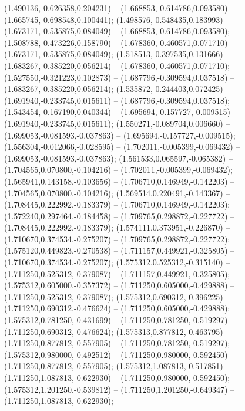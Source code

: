  (1.490136,-0.626358,0.204231) -- (1.668853,-0.614786,0.093580) -- (1.665745,-0.698548,0.100441);
 (1.498576,-0.548435,0.183993) -- (1.673171,-0.535875,0.084049) -- (1.668853,-0.614786,0.093580);
 (1.508788,-0.473226,0.158790) -- (1.678360,-0.460571,0.071710) -- (1.673171,-0.535875,0.084049);
 (1.518513,-0.397535,0.131666) -- (1.683267,-0.385220,0.056214) -- (1.678360,-0.460571,0.071710);
 (1.527550,-0.321223,0.102873) -- (1.687796,-0.309594,0.037518) -- (1.683267,-0.385220,0.056214);
 (1.535872,-0.244403,0.072425) -- (1.691940,-0.233745,0.015611) -- (1.687796,-0.309594,0.037518);
 (1.543454,-0.167190,0.040344) -- (1.695694,-0.157727,-0.009515) -- (1.691940,-0.233745,0.015611);
 (1.550271,-0.089704,0.006660) -- (1.699053,-0.081593,-0.037863) -- (1.695694,-0.157727,-0.009515);
 (1.556304,-0.012066,-0.028595) -- (1.702011,-0.005399,-0.069432) -- (1.699053,-0.081593,-0.037863);
 (1.561533,0.065597,-0.065382) -- (1.704565,0.070800,-0.104216) -- (1.702011,-0.005399,-0.069432);
 (1.565941,0.143158,-0.103656) -- (1.706710,0.146949,-0.142203) -- (1.704565,0.070800,-0.104216);
 (1.569514,0.220491,-0.143367) -- (1.708445,0.222992,-0.183379) -- (1.706710,0.146949,-0.142203);
 (1.572240,0.297464,-0.184458) -- (1.709765,0.298872,-0.227722) -- (1.708445,0.222992,-0.183379);
 (1.574111,0.373951,-0.226870) -- (1.710670,0.374534,-0.275207) -- (1.709765,0.298872,-0.227722);
 (1.575120,0.449823,-0.270538) -- (1.711157,0.449921,-0.325805) -- (1.710670,0.374534,-0.275207);
 (1.575312,0.525312,-0.315140) -- (1.711250,0.525312,-0.379087) -- (1.711157,0.449921,-0.325805);
 (1.575312,0.605000,-0.357372) -- (1.711250,0.605000,-0.429888) -- (1.711250,0.525312,-0.379087);
 (1.575312,0.690312,-0.396225) -- (1.711250,0.690312,-0.476624) -- (1.711250,0.605000,-0.429888);
 (1.575312,0.781250,-0.431699) -- (1.711250,0.781250,-0.519297) -- (1.711250,0.690312,-0.476624);
 (1.575313,0.877812,-0.463795) -- (1.711250,0.877812,-0.557905) -- (1.711250,0.781250,-0.519297);
 (1.575312,0.980000,-0.492512) -- (1.711250,0.980000,-0.592450) -- (1.711250,0.877812,-0.557905);
 (1.575312,1.087813,-0.517851) -- (1.711250,1.087813,-0.622930) -- (1.711250,0.980000,-0.592450);
 (1.575312,1.201250,-0.539812) -- (1.711250,1.201250,-0.649347) -- (1.711250,1.087813,-0.622930);
